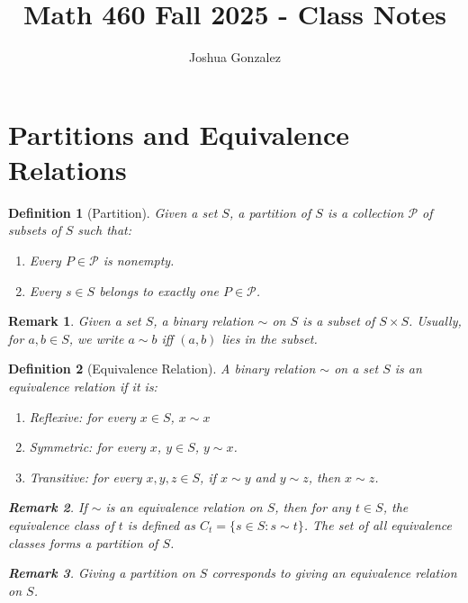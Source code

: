 \documentclass[12pt]{article}
\title{Math 460 Fall 2025 - Class Notes}
\author{Joshua Gonzalez}
\date{}
\newtheorem{definition}{Definition}[section]
\newtheorem{remark}{Remark}[section]
\begin{document}
\maketitle

\section{Partitions and Equivalence Relations}

\begin{definition}[Partition]
Given a set $S$, a \emph{partition} of $S$ is a collection $\mathcal{P}$ of subsets of $S$ such that:
\begin{enumerate}
    \item Every $P \in \mathcal{P}$ is nonempty.
    \item Every $s \in S$ belongs to exactly one $P \in \mathcal{P}$.
\end{enumerate}
\end{definition}
\begin{remark}
    Given a set $S$, a binary relation $\sim$ on $S$ is a subset of $S \times S$. Usually, for $a, b \in S$, we write $a \sim b$ iff $(a,b)$ lies in the subset. 
\end{remark}

\begin{definition}[Equivalence Relation]
A binary relation $\sim$ on a set $S$ is an \emph{equivalence relation} if it is:
\begin{enumerate}
    \item Reflexive: for every $x \in S$, $x \sim x$
    \item Symmetric: for every $x$, $y \in S$, $y \sim x$.
    \item Transitive: for every $x, y, z \in S$, if $x \sim y$ and $y \sim z$, then $x \sim z$.
\end{enumerate}

\begin{remark}
    If $\sim$ is an equivalence relation on $S$, then for any $t \in S$, the \emph{equivalence class} of $t$ is defined as $C_t = \{ s \in S : s \sim t \}$. The set of all equivalence classes forms a partition of $S$.
\end{remark}

\begin{remark}
    Giving a partition on $S$ corresponds to giving an equivalence relation on $S$.
\end{remark}
\end{definition}
\end{document}
